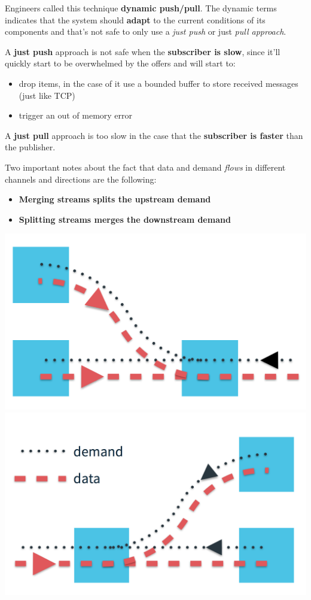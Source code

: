 Engineers called this technique \textbf{dynamic push/pull}. The dynamic
terms indicates that the system should \textbf{adapt} to the current
conditions of its components and that's not safe to only use a
\emph{just push} or just \emph{pull approach}.

A \textbf{just push} approach is not safe when the \textbf{subscriber is
slow}, since it'll quickly start to be overwhelmed by the offers and
will start to:

\begin{itemize}
\itemsep1pt\parskip0pt
\item
  drop items, in the case of it use a bounded buffer to store received
  messages (just like TCP)
\item
  trigger an out of memory error
\end{itemize}

A \textbf{just pull} approach is too slow in the case that the
\textbf{subscriber is faster} than the publisher.

Two important notes about the fact that data and demand \emph{flows} in
different channels and directions are the following:

\begin{itemize}
\itemsep1pt\parskip0pt
\item
  \textbf{Merging streams splits the upstream demand}
\item
  \textbf{Splitting streams merges the downstream demand}
\end{itemize}

\includegraphics[scale=0.25]{imgs/merge.png} 
\includegraphics[scale=0.25]{imgs/split.png}

